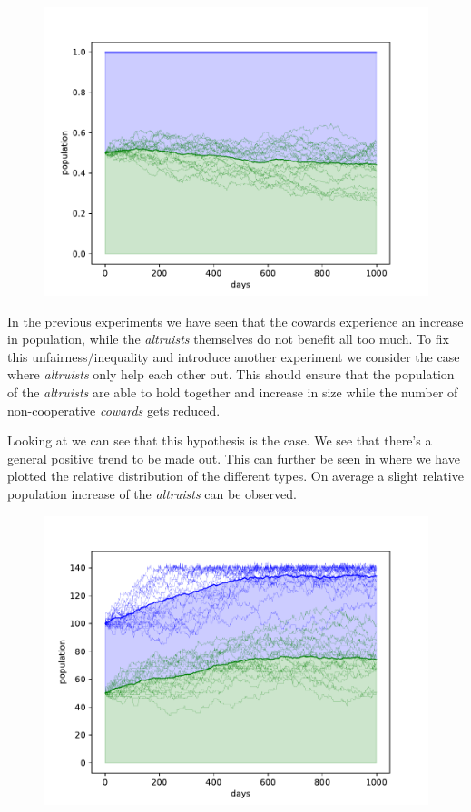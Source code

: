 \documentclass[sigconf]{acmart}
\newcommand{\todo}[1]{{\color{red}{#1}}}
\newcommand{\cowards}{\textit{cowards}\xspace}
\newcommand{\altruists}{\textit{altruists}\xspace}
\begin{document}
    \begin{figure}
        \includegraphics[width=\columnwidth]{figures/alt_cow_increase_separated_rel}
        \caption{\todo{}}
        \label{fig:alt_cow_separated_rel}
    \end{figure}

    In the previous experiments we have seen that the cowards experience an increase in population, while the \altruists themselves do not benefit all too much.
    To fix this unfairness/inequality and introduce another experiment we consider the case where \altruists only help each other out.
    This should ensure that the population of the \altruists are able to hold together and increase in size while the number of non-cooperative \cowards gets reduced.

    Looking at  we can see that this hypothesis is the case.
    We see that there's a general positive trend to be made out.
    This can further be seen in  where we have plotted the relative distribution of the different types.
    On average a slight relative population increase of the \altruists can be observed.




    \begin{figure}
        \includegraphics[width=\columnwidth]{figures/alt_ego}
        \caption{\todo{}}
        \label{fig:alt_ego}
    \end{figure}
\end{document}
